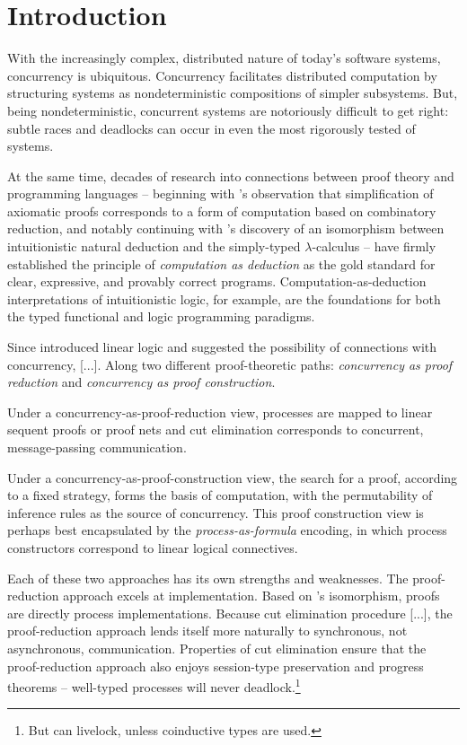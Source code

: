\chapter{Introduction}\label{ch:introduction}

With the increasingly complex, distributed nature of today's software systems, concurrency is ubiquitous.
Concurrency facilitates distributed computation by structuring systems as nondeterministic compositions of simpler subsystems.
But, being nondeterministic, concurrent systems are notoriously difficult to get right: 
subtle races and deadlocks can occur in even the most rigorously tested of systems.

At the same time, decades of research into connections between proof theory and programming languages -- beginning with \citeauthor{Curry:PNAS34}'s observation that simplification of axiomatic proofs corresponds to a form of computation based on combinatory reduction\autocite{Curry:PNAS34}, and notably continuing with \citeauthor{Howard:69}'s discovery of an isomorphism between intuitionistic natural deduction and the simply-typed $\lambda$-calculus\autocite{Howard:69} -- have firmly established the principle of \emph{computation as deduction} as the gold standard for clear, expressive, and provably correct programs.
Computation-as-deduction interpretations of intuitionistic logic, for example, are the foundations for both the typed functional\autocite{Martin-Lof:LMPS80} and logic\autocites{Miller+:PAL91}{Andreoli:JLC92} programming paradigms.

Since \citeauthor{Girard:TCS87} introduced linear logic\autocite{Girard:TCS87} and suggested the possibility of connections with concurrency, [...].
Along two different proof-theoretic paths: \emph{concurrency as proof reduction} and \emph{concurrency as proof construction}.

Under a concurrency-as-proof-reduction view, processes are mapped to linear sequent proofs or proof nets and cut elimination corresponds to concurrent, message-passing communication.


Under a concurrency-as-proof-construction view, the search for a proof, according to a fixed strategy, forms the basis of computation, with the permutability of inference rules as the source of concurrency.
This proof construction view is perhaps best encapsulated by the \emph{process-as-formula} encoding, in which process constructors correspond to linear logical connectives\autocite{Miller:ELP92}.
 

Each of these two approaches has its own strengths and weaknesses.
The proof-reduction approach excels at
implementation.
Based on \citeauthor{??}'s isomorphism, proofs are directly process implementations. 
Because cut elimination procedure [...], the proof-reduction approach lends itself more naturally to synchronous, not asynchronous, communication.
Properties of cut elimination ensure that the proof-reduction approach also enjoys session-type preservation and progress theorems -- well-typed processes will never deadlock.\footnote{But can livelock, unless coinductive types are used.}

